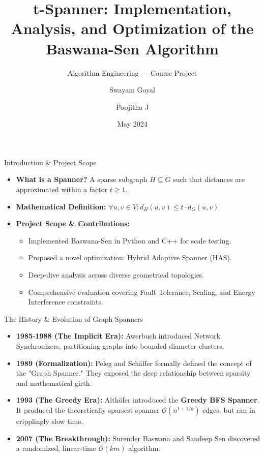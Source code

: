 \documentclass[aspectratio=169]{beamer}
\title[t-Spanner Implementation \& Analysis]{t-Spanner: Implementation, Analysis, and Optimization of the Baswana-Sen Algorithm}
\subtitle{Algorithm Engineering --- Course Project}
\author[Goyal, Poojitha]{Swayam Goyal \and Poojitha J}
\institute[Algorithm Engineering]{Semester 4}
\date{May 2024}
\begin{document}
\begin{frame}
    \titlepage
\end{frame}

\begin{frame}{Introduction \& Project Scope}
    \begin{itemize}
        \item \textbf{What is a Spanner?} A sparse subgraph $H \subseteq G$ such that distances are approximated within a factor $t \geq 1$.
        \item \textbf{Mathematical Definition:} $\forall u, v \in V: d_H(u, v) \leq t \cdot d_G(u, v)$
        \item \textbf{Project Scope \& Contributions:}
        \begin{itemize}
            \item Implemented Baswana-Sen in Python and C++ for scale testing.
            \item Proposed a novel optimization: Hybrid Adaptive Spanner (HAS).
            \item Deep-dive analysis across diverse geometrical topologies.
            \item Comprehensive evaluation covering Fault Tolerance, Scaling, and Energy Interference constraints.
        \end{itemize}
    \end{itemize}
\end{frame}

\begin{frame}{The History \& Evolution of Graph Spanners}
    \begin{itemize}
        \item \textbf{1985-1988 (The Implicit Era):} Awerbuch introduced Network Synchronizers, partitioning graphs into bounded diameter clusters.
        \item \textbf{1989 (Formalization):} Peleg and Schäffer formally defined the concept of the "Graph Spanner." They exposed the deep relationship between sparsity and mathematical girth.
        \item \textbf{1993 (The Greedy Era):} Althöfer introduced the \textbf{Greedy BFS Spanner}. It produced the theoretically sparsest spanner $\mathcal{O}(n^{1+1/k})$ edges, but ran in cripplingly slow time.
        \item \textbf{2007 (The Breakthrough):} Surender Baswana and Sandeep Sen discovered a randomized, linear-time $\mathcal{O}(km)$ algorithm.
    \end{itemize}
\end{frame}
\end{document}
